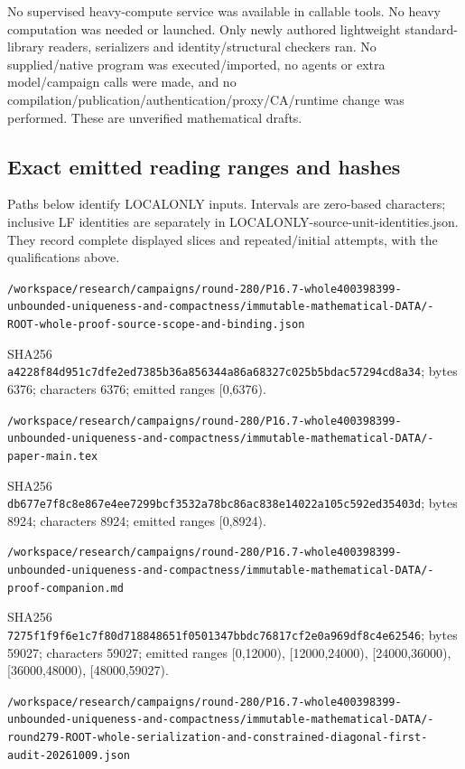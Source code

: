 \documentclass[11pt]{article}
\begin{document}
No supervised heavy-compute service was available in callable tools. No heavy computation was needed or launched. Only newly authored lightweight standard-library readers, serializers and identity/structural checkers ran. No supplied/native program was executed/imported, no agents or extra model/campaign calls were made, and no compilation/publication/authentication/proxy/CA/runtime change was performed. These are unverified mathematical drafts.

\subsection*{Exact emitted reading ranges and hashes}
Paths below identify LOCALONLY inputs. Intervals are zero-based characters; inclusive LF identities are separately in LOCALONLY-source-unit-identities.json. They record complete displayed slices and repeated/initial attempts, with the qualifications above.

\texttt{/\allowbreak workspace/\allowbreak research/\allowbreak campaigns/\allowbreak round-280/\allowbreak P16.7-whole400398399-unbounded-uniqueness-and-compactness/\allowbreak immutable-mathematical-DATA/-ROOT-whole-proof-source-scope-and-binding.json}

SHA256 \texttt{a4228f84d951c7dfe2ed7385b36a856344a86a68327c025b5bdac57294cd8a34}; bytes 6376; characters 6376; emitted ranges [0,6376).

\texttt{/\allowbreak workspace/\allowbreak research/\allowbreak campaigns/\allowbreak round-280/\allowbreak P16.7-whole400398399-unbounded-uniqueness-and-compactness/\allowbreak immutable-mathematical-DATA/-paper-main.tex}

SHA256 \texttt{db677e7f8c8e867e4ee7299bcf3532a78bc86ac838e14022a105c592ed35403d}; bytes 8924; characters 8924; emitted ranges [0,8924).

\texttt{/\allowbreak workspace/\allowbreak research/\allowbreak campaigns/\allowbreak round-280/\allowbreak P16.7-whole400398399-unbounded-uniqueness-and-compactness/\allowbreak immutable-mathematical-DATA/-proof-companion.md}

SHA256 \texttt{7275f1f9f6e1c7f80d718848651f0501347bbdc76817cf2e0a969df8c4e62546}; bytes 59027; characters 59027; emitted ranges [0,12000), [12000,24000), [24000,36000), [36000,48000), [48000,59027).

\texttt{/\allowbreak workspace/\allowbreak research/\allowbreak campaigns/\allowbreak round-280/\allowbreak P16.7-whole400398399-unbounded-uniqueness-and-compactness/\allowbreak immutable-mathematical-DATA/-round279-ROOT-whole-serialization-and-constrained-diagonal-first-audit-20261009.json}
\end{document}
